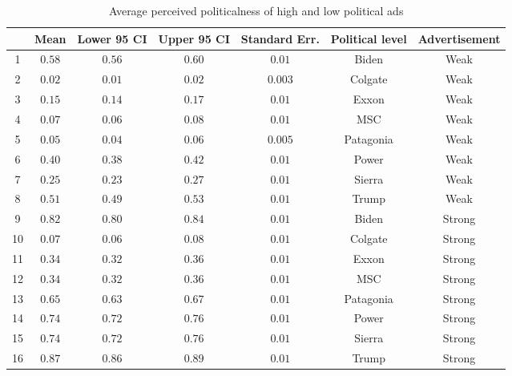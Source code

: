 
\begin{table}[!htbp] \centering 
  \caption{Average perceived politicalness of high and low political ads} 
  \label{table:pool-means} 
\begin{tabular}{@{\extracolsep{5pt}} ccccccc} 
\toprule 
 & Mean & Lower 95 CI & Upper 95 CI & Standard Err. & Political level & Advertisement \\ 
\midrule 1 & $0.58$ & $0.56$ & $0.60$ & $0.01$ & Biden & Weak \\ 
2 & $0.02$ & $0.01$ & $0.02$ & $0.003$ & Colgate & Weak \\ 
3 & $0.15$ & $0.14$ & $0.17$ & $0.01$ & Exxon & Weak \\ 
4 & $0.07$ & $0.06$ & $0.08$ & $0.01$ & MSC & Weak \\ 
5 & $0.05$ & $0.04$ & $0.06$ & $0.005$ & Patagonia & Weak \\ 
6 & $0.40$ & $0.38$ & $0.42$ & $0.01$ & Power & Weak \\ 
7 & $0.25$ & $0.23$ & $0.27$ & $0.01$ & Sierra & Weak \\ 
8 & $0.51$ & $0.49$ & $0.53$ & $0.01$ & Trump & Weak \\ 
9 & $0.82$ & $0.80$ & $0.84$ & $0.01$ & Biden & Strong \\ 
10 & $0.07$ & $0.06$ & $0.08$ & $0.01$ & Colgate & Strong \\ 
11 & $0.34$ & $0.32$ & $0.36$ & $0.01$ & Exxon & Strong \\ 
12 & $0.34$ & $0.32$ & $0.36$ & $0.01$ & MSC & Strong \\ 
13 & $0.65$ & $0.63$ & $0.67$ & $0.01$ & Patagonia & Strong \\ 
14 & $0.74$ & $0.72$ & $0.76$ & $0.01$ & Power & Strong \\ 
15 & $0.74$ & $0.72$ & $0.76$ & $0.01$ & Sierra & Strong \\ 
16 & $0.87$ & $0.86$ & $0.89$ & $0.01$ & Trump & Strong \\ 
\bottomrule 
\end{tabular} 
\end{table} 
